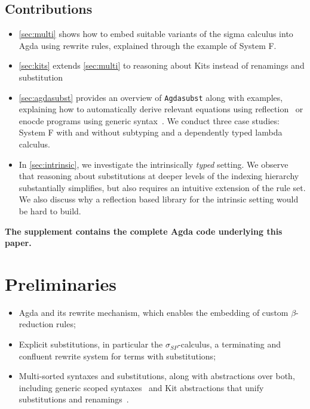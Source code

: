 \documentclass[screen,nonacm]{acmart}
\begin{document}
\subsection*{Contributions}

\begin{itemize}
  \item \cref{sec:multi} shows how to embed suitable variants of the
        sigma calculus into Agda using rewrite rules, explained through the example of System F.

  \item \cref{sec:kits} extends \cref{sec:multi} to reasoning about Kits instead of
        renamings and substitution

  \item \cref{sec:agdasubst} provides an overview of \texttt{Agdasubst} along with examples,
        explaining how to automatically derive relevant equations using
        reflection~\cite{saffrich:LIPIcs.ITP.2024.32} or enocde programs using generic 
        syntax~\cite{allais2021typescopesafeuniverse}.
        We conduct three case studies:
        System F with and without subtyping and a dependently typed lambda calculus.

  \item In \cref{sec:intrinsic}, we investigate the intrinsically \emph{typed} setting.
        We observe that reasoning about substitutions at deeper levels of the indexing
        hierarchy substantially simplifies, but also requires an intuitive extension of
        the rule set. We also discuss why a reflection based library for the intrinsic
        setting would be hard to build.
\end{itemize}

\textbf{The supplement contains the complete Agda code underlying this paper.}

\section{Preliminaries}\label{sec:preliminaries}

\begin{itemize}
  \item Agda and its rewrite mechanism, which enables the embedding of custom
        $\beta$-reduction rules;
  \item Explicit substitutions, in particular the $\sigma_{SP}$-calculus, a terminating
        and confluent rewrite system for terms with substitutions;
  \item Multi-sorted syntaxes and substitutions, along with abstractions over both,
        including generic scoped syntaxes~\cite{allais2021typescopesafeuniverse} and
        Kit abstractions that unify substitutions and
        renamings~\cite{stronglytyped,ren-sub}.
\end{itemize}
\end{document}
